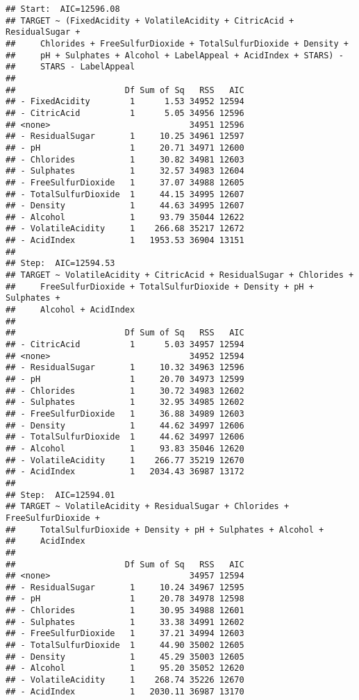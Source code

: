 \documentclass[]{article}
\begin{document}
\begin{verbatim}
## Start:  AIC=12596.08
## TARGET ~ (FixedAcidity + VolatileAcidity + CitricAcid + ResidualSugar + 
##     Chlorides + FreeSulfurDioxide + TotalSulfurDioxide + Density + 
##     pH + Sulphates + Alcohol + LabelAppeal + AcidIndex + STARS) - 
##     STARS - LabelAppeal
## 
##                      Df Sum of Sq   RSS   AIC
## - FixedAcidity        1      1.53 34952 12594
## - CitricAcid          1      5.05 34956 12596
## <none>                            34951 12596
## - ResidualSugar       1     10.25 34961 12597
## - pH                  1     20.71 34971 12600
## - Chlorides           1     30.82 34981 12603
## - Sulphates           1     32.57 34983 12604
## - FreeSulfurDioxide   1     37.07 34988 12605
## - TotalSulfurDioxide  1     44.15 34995 12607
## - Density             1     44.63 34995 12607
## - Alcohol             1     93.79 35044 12622
## - VolatileAcidity     1    266.68 35217 12672
## - AcidIndex           1   1953.53 36904 13151
## 
## Step:  AIC=12594.53
## TARGET ~ VolatileAcidity + CitricAcid + ResidualSugar + Chlorides + 
##     FreeSulfurDioxide + TotalSulfurDioxide + Density + pH + Sulphates + 
##     Alcohol + AcidIndex
## 
##                      Df Sum of Sq   RSS   AIC
## - CitricAcid          1      5.03 34957 12594
## <none>                            34952 12594
## - ResidualSugar       1     10.32 34963 12596
## - pH                  1     20.70 34973 12599
## - Chlorides           1     30.72 34983 12602
## - Sulphates           1     32.95 34985 12602
## - FreeSulfurDioxide   1     36.88 34989 12603
## - Density             1     44.62 34997 12606
## - TotalSulfurDioxide  1     44.62 34997 12606
## - Alcohol             1     93.83 35046 12620
## - VolatileAcidity     1    266.77 35219 12670
## - AcidIndex           1   2034.43 36987 13172
## 
## Step:  AIC=12594.01
## TARGET ~ VolatileAcidity + ResidualSugar + Chlorides + FreeSulfurDioxide + 
##     TotalSulfurDioxide + Density + pH + Sulphates + Alcohol + 
##     AcidIndex
## 
##                      Df Sum of Sq   RSS   AIC
## <none>                            34957 12594
## - ResidualSugar       1     10.24 34967 12595
## - pH                  1     20.78 34978 12598
## - Chlorides           1     30.95 34988 12601
## - Sulphates           1     33.38 34991 12602
## - FreeSulfurDioxide   1     37.21 34994 12603
## - TotalSulfurDioxide  1     44.90 35002 12605
## - Density             1     45.29 35003 12605
## - Alcohol             1     95.20 35052 12620
## - VolatileAcidity     1    268.74 35226 12670
## - AcidIndex           1   2030.11 36987 13170
\end{verbatim}
\end{document}
